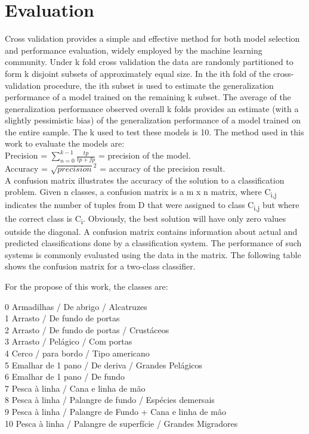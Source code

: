\section{Evaluation} %
\label{sub:evaluation}
Cross \textendash validation \cite{CrossValidatory} provides a simple and effective method for both model selection and performance evaluation, widely employed by the machine learning community. Under k \textendash fold cross \textendash validation the data are randomly partitioned to form k disjoint subsets of approximately equal size. In the ith fold of the cross-validation procedure, the ith subset is used to estimate the generalization performance of a model trained on the remaining k  subset. The average of the generalization performance observed overall k folds provides an estimate (with a slightly pessimistic bias) of the generalization performance of a model trained on the entire sample.
The k used to test these models is 10.
The method used in this work to evaluate the models are:\\
Precision = \(\sum_{n=0}^{k-1}\frac{tp}{tp+fp} \)  = precision of the model.\\
Accuracy = \( \sqrt{precision} ^ 2\) = accuracy of the precision result.\\


A confusion matrix \cite{CMPatil} illustrates the accuracy of the solution to a classification problem. Given n classes, a confusion matrix is a m x n matrix, where C\textsubscript{i,j} indicates the number of tuples from D that were assigned to class C\textsubscript{i,j} but where the correct class is C\textsubscript{i}.
Obviously, the best solution will have only zero values outside the diagonal.
A confusion matrix contains information about actual and predicted classifications done by a classification system. The performance of such systems is commonly evaluated using the data in the matrix. The following table shows the confusion matrix for a two-class classifier. 

For the propose of this work, the classes are: 

0    Armadilhas / De abrigo / Alcatruzes \\
1    Arrasto / De fundo de portas \\
2    Arrasto / De fundo de portas / Crustáceos\\
3    Arrasto / Pelágico / Com portas\\
4    Cerco / para bordo / Tipo americano\\
5    Emalhar de 1 pano / De deriva / Grandes Pelágicos\\
6    Emalhar de 1 pano / De fundo\\
7    Pesca à linha / Cana e linha de mão\\
8    Pesca à linha / Palangre de fundo / Espécies demersais\\
9    Pesca à linha / Palangre de Fundo + Cana e linha de mão\\
10    Pesca à linha / Palangre de superfície / Grandes Migradores




